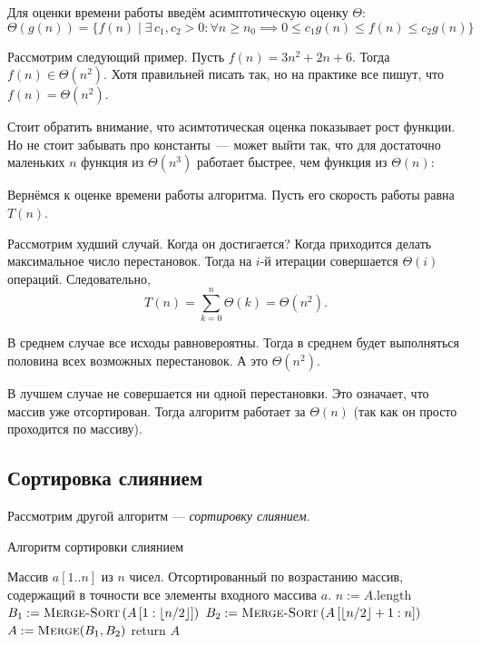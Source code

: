 \documentclass[a4paper,12pt]{article}
\begin{document}
	Для оценки времени работы введём асимптотическую оценку $\Theta$:
	\[\Theta(g(n)) = \{f(n)\mid\exists\,c_1, c_2 > 0: \forall n\geqslant n_0 \implies 0 \leqslant c_1g(n) \leqslant f(n) \leqslant c_2g(n)\}\]
	
	Рассмотрим следующий пример. Пусть $f(n) = 3n^2 + 2n + 6$. Тогда $f(n) \in \Theta(n^2)$. Хотя правильней писать так, но на практике все пишут, что $f(n) = \Theta(n^2)$.
	
	Стоит обратить внимание, что асимтотическая оценка показывает рост функции. Но не стоит забывать про константы~--- может выйти так, что для достаточно маленьких $n$ функция из $\Theta(n^3)$ работает быстрее, чем функция из $\Theta(n)$:
	\begin{center}
		\end{center}
		
		Вернёмся к оценке времени работы алгоритма. Пусть его скорость работы равна $T(n)$.
		
		Рассмотрим худший случай. Когда он достигается? Когда приходится делать максимальное число перестановок. Тогда на $i$-й итерации совершается $\Theta(i)$ операций. Следовательно, \[T(n) = \sum_{k = 0}^{n} \Theta(k) = \Theta(n^2).\]
		
		В среднем случае все исходы равновероятны. Тогда в среднем будет выполняться половина всех возможных перестановок. А это $\Theta(n^2)$.
		
		В лучшем случае не совершается ни одной перестановки. Это означает, что массив уже отсортирован. Тогда алгоритм работает за $\Theta(n)$ (так как он просто проходится по массиву).
		
\subsection{Сортировка слиянием}
Рассмотрим другой алгоритм --- \emph{сортировку слиянием}.

\begin{algorithm}[H]
	\caption{Алгоритм сортировки слиянием}
	\label{algo:merge-sort}
	\begin{algorithmic}[1]
		\Require Массив $a[1..n]$ из $n$ чисел. 
		\Ensure Отсортированный по возрастанию массив, содержащий в точности все элементы входного массива $a$.
		\State $n \mathrel{:=} A.$length
		\State $B_1 \mathrel{:=} \textsc{Merge-Sort}\left(A\left[1: \lfloor n/2 \rfloor\right]\right)$
		\State $B_2 \mathrel{:=} \textsc{Merge-Sort}\left(A\left[\lfloor n/2 \rfloor + 1 : n\right]\right)$
		\State $A \mathrel{:=} \textsc{Merge}(B_1, B_2)$ 
		\EndIf
		\State return $A$
		\EndFunction
	\end{algorithmic}
\end{algorithm}
\end{document}
